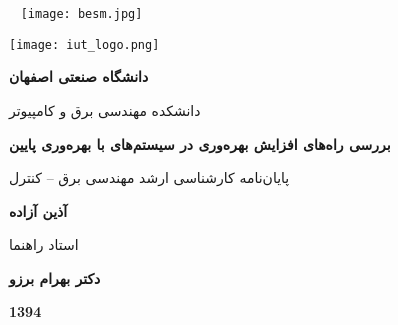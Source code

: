 

\thispagestyle{empty}
\mbox{}
\pagebreak

\thispagestyle{empty}
\begin{center}
	~\vfill
	\texttt{[image: besm.jpg]}
	~\vfill
\end{center}
\pagebreak

\thispagestyle{empty}
\begin{center}
\texttt{[image: iut\_logo.png]}
\vspace{0.4cm}

\textbf{دانشگاه صنعتی اصفهان}\\
\vspace{0.4cm}

{\large

	دانشکده مهندسی برق و کامپیوتر
}
\vspace{3.5cm}

{\Large
	\textbf{بررسی راه‌های افزایش بهره‌وری در سیستم‌های با بهره‌وری پایین}\\
}
\vspace{3.5cm}

{\Large
	پایان‌نامه کارشناسی ارشد مهندسی برق -- کنترل\\
}
\vspace{1cm}

{\large
	\textbf{آذین آزاده}\\
}
\vspace{3.5cm}

{\large
	استاد راهنما\\
}
\vspace{0.5cm}

{\large
	\textbf{دکتر بهرام برزو}\\
}
\vspace{4cm}

\textbf{1394}

\end{center}
\restoregeometry
\pagebreak

